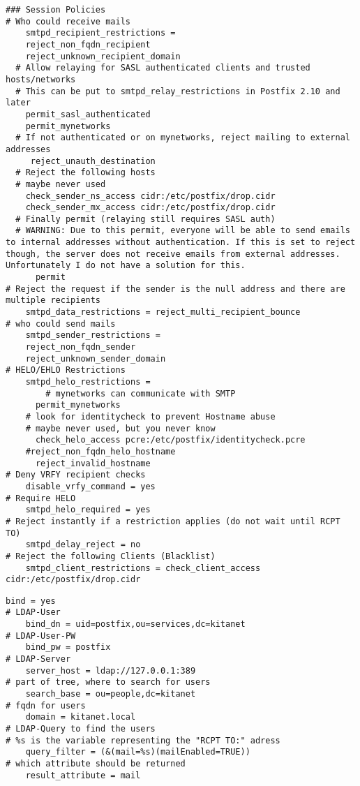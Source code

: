 \begin{lstlisting}[caption={/etc/postfix/main.cf}, label={postfix/main.cf}]
### Session Policies  
# Who could receive mails
	smtpd_recipient_restrictions =
    reject_non_fqdn_recipient
    reject_unknown_recipient_domain
  # Allow relaying for SASL authenticated clients and trusted hosts/networks
  # This can be put to smtpd_relay_restrictions in Postfix 2.10 and later 
  	permit_sasl_authenticated
  	permit_mynetworks
  # If not authenticated or on mynetworks, reject mailing to external addresses
 	 reject_unauth_destination
  # Reject the following hosts
  # maybe never used
    check_sender_ns_access cidr:/etc/postfix/drop.cidr
    check_sender_mx_access cidr:/etc/postfix/drop.cidr
  # Finally permit (relaying still requires SASL auth)
  # WARNING: Due to this permit, everyone will be able to send emails to internal addresses without authentication. If this is set to reject though, the server does not receive emails from external addresses. Unfortunately I do not have a solution for this.
	  permit
# Reject the request if the sender is the null address and there are multiple recipients
	smtpd_data_restrictions = reject_multi_recipient_bounce
# who could send mails
	smtpd_sender_restrictions =
    reject_non_fqdn_sender
    reject_unknown_sender_domain
# HELO/EHLO Restrictions
	smtpd_helo_restrictions =
		# mynetworks can communicate with SMTP
      permit_mynetworks
    # look for identitycheck to prevent Hostname abuse
    # maybe never used, but you never know
      check_helo_access pcre:/etc/postfix/identitycheck.pcre
    #reject_non_fqdn_helo_hostname
      reject_invalid_hostname
# Deny VRFY recipient checks
	disable_vrfy_command = yes
# Require HELO
	smtpd_helo_required = yes
# Reject instantly if a restriction applies (do not wait until RCPT TO)
	smtpd_delay_reject = no
# Reject the following Clients (Blacklist)
	smtpd_client_restrictions = check_client_access cidr:/etc/postfix/drop.cidr
\end{lstlisting}

\begin{lstlisting}[caption={/etc/postfix/ldap\_virtual\_recipients.cf}, label={postfix/recipients.cf}]
	bind = yes
# LDAP-User
	bind_dn = uid=postfix,ou=services,dc=kitanet
# LDAP-User-PW
	bind_pw = postfix
# LDAP-Server
	server_host = ldap://127.0.0.1:389
# part of tree, where to search for users
	search_base = ou=people,dc=kitanet
# fqdn for users
	domain = kitanet.local
# LDAP-Query to find the users
# %s is the variable representing the "RCPT TO:" adress
	query_filter = (&(mail=%s)(mailEnabled=TRUE))
# which attribute should be returned
	result_attribute = mail
\end{lstlisting}


